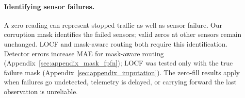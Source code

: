 \paragraph{Identifying sensor failures.}
A zero reading can represent stopped traffic as well as sensor failure.
Our corruption mask identifies the failed sensors; valid zeros at other
sensors remain unchanged. LOCF and mask-aware routing both require this
identification. Detector errors increase MAE for mask-aware routing
(Appendix~\ref{sec:appendix_mask_fpfn}); LOCF was tested only with the true
failure mask (Appendix~\ref{sec:appendix_imputation}). The zero-fill results
apply when failures go undetected, telemetry is delayed, or carrying forward
the last observation is unreliable.

